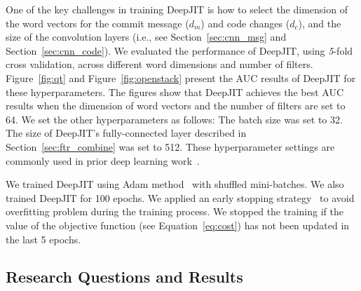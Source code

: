 One of the key challenges in training DeepJIT is how to select the dimension of the word vectors for the commit message ($d_m$) and code changes ($d_c$), and the size of the convolution layers (i.e., see Section~\ref{sec:cnn_msg} and Section~\ref{sec:cnn_code}). We evaluated the performance of DeepJIT, using \textit{5}-fold cross validation, across different word dimensions and number of filters. Figure~\ref{fig:qt} and Figure~\ref{fig:openstack} present the AUC results of DeepJIT for these hyperparameters. The figures show that DeepJIT achieves the best AUC results when the dimension of word vectors and the number of filters are set to 64. We set the other hyperparameters as follows: The batch size was set to 32. The size of DeepJIT's fully-connected layer described in Section~\ref{sec:ftr_combine} was set to 512. These hyperparameter settings are commonly used in prior deep learning work~\cite{severyn2015learning, huo2016learning, huo2017enhancing, hinton2012improving}.

We trained DeepJIT using Adam method~\cite{kingma2014adam} with shuffled mini-batches. We also trained DeepJIT for 100 epochs. We applied an early stopping strategy~\cite{prechelt1998automatic, caruana2001overfitting} to avoid overfitting problem during the training process. We stopped the training if the value of the objective function (see Equation~\ref{eq:cost}) has not been updated in the last 5 epochs. 

 
 

\subsection{Research Questions and Results}
\label{sec:rq_results}

